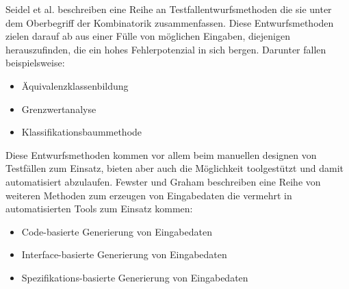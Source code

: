 Seidel et al. \cite[vgl. S. 27]{seidl_basiswissen_2012} beschreiben eine Reihe an Testfallentwurfsmethoden die sie unter dem Oberbegriff der Kombinatorik zusammenfassen. Diese Entwurfsmethoden zielen darauf ab aus einer Fülle von möglichen Eingaben, diejenigen herauszufinden, die ein hohes Fehlerpotenzial in sich bergen. Darunter fallen beispielsweise:
\begin{itemize}
\item Äquivalenzklassenbildung
\item Grenzwertanalyse
\item Klassifikationsbaummethode
\end{itemize}
Diese Entwurfsmethoden kommen vor allem beim manuellen designen von Testfällen zum Einsatz, bieten aber auch die Möglichkeit toolgestützt und damit automatisiert abzulaufen.
Fewster und Graham \cite[vgl. S. 19 ff.]{fewster_software_1999} beschreiben eine Reihe von weiteren Methoden zum erzeugen von Eingabedaten die vermehrt in automatisierten Tools zum Einsatz kommen:
\begin{itemize}
\item Code-basierte Generierung von Eingabedaten
\item Interface-basierte Generierung von Eingabedaten
\item Spezifikations-basierte Generierung von Eingabedaten
\end{itemize}

